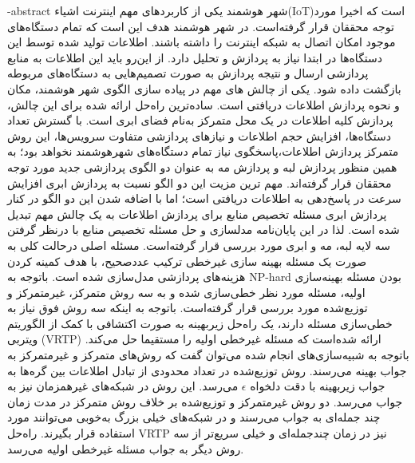\fa-abstract{
	شهر هوشمند یکی از کاربردهای مهم اینترنت اشیاء(IoT)است که اخیرا مورد توجه محققان قرار گرفته‌است. در شهر هوشمند هدف این است که تمام دستگاه‌های موجود امکان اتصال به شبکه اینترنت را داشته باشند. 
	اطلاعات تولید شده توسط این دستگاه‌ها در ابتدا نیاز به پردازش و تحلیل دارد. از این‌رو باید این اطلاعات به منابع پردازشی ارسال و نتیجه پردازش به صورت تصمیم‌هایی به دستگاه‌های مربوطه بازگشت داده شود. 
	یکی از چالش های مهم در پیاده سازی الگوی شهر هوشمند، مکان و نحوه پردازش اطلاعات دریافتی است. ساده‌ترین راه‌حل‌ ارائه شده برای این چالش، پردازش کلیه‌ اطلاعات در یک محل متمرکز به‌نام فضای ابری است. با گسترش تعداد دستگاه‌ها، افزایش حجم اطلاعات و نیازهای پردازشی متفاوت سرویس‌ها، این روش متمرکز پردازش اطلاعات،پاسخگوی نیاز تمام دستگاه‌های شهرهوشمند نخواهد بود؛
	به همین منظور پردازش لبه و پردازش مه به عنوان دو الگوی پردازشی جدید مورد توجه محققان قرار گرفته‌اند. مهم ترین مزیت این دو الگو نسبت به پردازش ابری افزایش سرعت در پاسخ‌دهی به اطلاعات دریافتی است؛ اما با اضافه شدن این دو الگو در کنار پردازش ابری مسئله تخصیص منابع برای پردازش اطلاعات به یک چالش مهم تبدیل شده است.
	لذا در این پایان‌نامه مدلسازی و حل مسئله تخصیص منابع با درنظر گرفتن سه لایه لبه، مه و ابری مورد بررسی قرار گرفته‌است. مسئله اصلی درحالت کلی به صورت یک مسئله بهینه سازی غیرخطی ترکیب عددصحیح، با هدف کمینه کردن هزینه‌های پردازشی مدل‌سازی شده است. 
	باتوجه به NP-hard بودن مسئله بهینه‌سازی اولیه، مسئله مورد نظر خطی‌سازی شده و به سه روش متمرکز، غیرمتمرکز و توزیع‌شده مورد بررسی قرار گرفته‌است.
	باتوجه به اینکه سه روش فوق نیاز به خطی‌سازی مسئله دارند، یک راه‌حل زیر‌بهینه به صورت اکتشافی با کمک از الگوریتم ویتربی (VRTP) ارائه شده‌است که مسئله غیرخطی اولیه را مستقیما حل می‌کند.
	باتوجه به شبیه‌سازی‌های انجام شده می‌توان گفت که روش‌های متمرکز و غیرمتمرکز به جواب بهینه می‌رسند. روش توزیع‌شده در تعداد محدودی از تبادل اطلاعات بین گره‌ها به جواب زیر‌بهینه با دقت دلخواه $\epsilon$ می‌رسد. این روش در شبکه‌های غیرهمزمان نیز به جواب می‌رسد. دو روش غیرمتمرکز و توزیع‌شده بر خلاف روش متمرکز در مدت زمان چند جمله‌ای به جواب می‌رسند و در شبکه‌های خیلی بزرگ به‌خوبی می‌توانند مورد استفاده قرار بگیرند. راه‌حل VRTP نیز در زمان چندجمله‌ای و خیلی سریع‌تر از سه روش دیگر به جواب مسئله غیرخطی اولیه می‌رسد.  
}

\cleartorightpage
\abstractPage

\cleartorightpage
